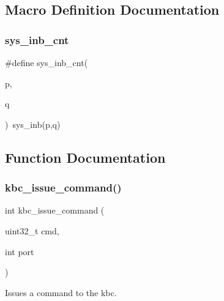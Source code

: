 \subsection{Macro Definition Documentation}
\mbox{\label{group__kbc_gaefb2d8ab6a450744c686e348063ebc32}} 
\subsubsection{\texorpdfstring{sys\+\_\+inb\+\_\+cnt}{sys\_inb\_cnt}}
{\footnotesize\ttfamily \#define sys\+\_\+inb\+\_\+cnt(\begin{DoxyParamCaption}\item[{}]{p,  }\item[{}]{q }\end{DoxyParamCaption})~sys\+\_\+inb(p,q)}



\subsection{Function Documentation}
\mbox{\label{group__kbc_ga547e83b3378cd67366e45d3c9565374a}} 
\subsubsection{\texorpdfstring{kbc\+\_\+issue\+\_\+command()}{kbc\_issue\_command()}}
{\footnotesize\ttfamily int kbc\+\_\+issue\+\_\+command (\begin{DoxyParamCaption}\item[{uint32\+\_\+t}]{cmd,  }\item[{int}]{port }\end{DoxyParamCaption})}



Issues a command to the kbc. 


